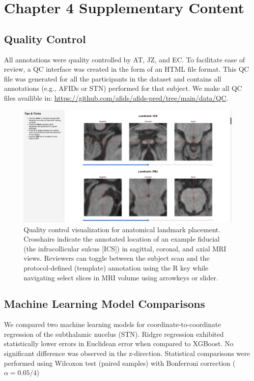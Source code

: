 \chapter{Chapter 4 Supplementary Content}\label{app:suppcontentch4}
\newpage

\section{Quality Control}\label{app:qualitycontrol}
All annotations were quality controlled by AT, JZ, and EC. To facilitate ease of review, a QC interface was created in the form of an HTML file format. This QC file was generated for all the participants in the dataset and contains all annotations (e.g., AFIDs or STN) performed for that subject. We make all QC files availible in: \url{https://github.com/afids/afids-pred/tree/main/data/QC}.

\begin{figure}[hbt!]
    \centering
    \includegraphics[width=1\linewidth]{figs/figuresupQC.png}
    \caption{Quality control visualization for anatomical landmark placement. Crosshairs indicate the annotated location of an example fiducial (the infracollicular sulcus [ICS]) in sagittal, coronal, and axial MRI views. Reviewers can toggle between the subject scan and the protocol-defined (template) annotation using the R key while navigating select slices in MRI volume using arrowkeys or slider.}
    \label{fig:figuresupQC}
\end{figure}

\newpage
\section{Machine Learning Model Comparisons}\label{app:qualitycontrol}
We compared two machine learning models for coordinate-to-coordinate regression of the subthalamic nucelus (STN). Ridgre regression exhibited statistically lower errors in Euclidean error when compared to XGBoost. No significant difference was observed in the z-direction. Statistical comparisons were performed using Wilcoxon test (paired samples) with Bonferroni correction (\(\alpha = 0.05/4\))



